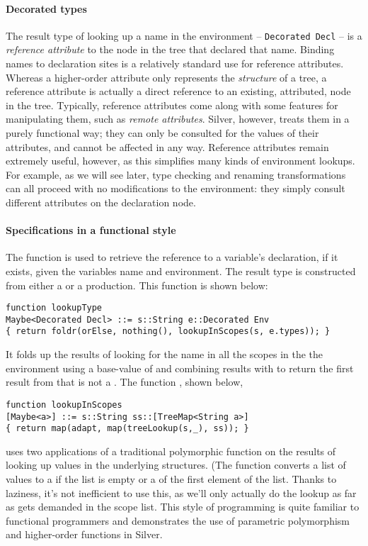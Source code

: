 \paragraph{Decorated types}
The result type of looking up a name in the environment -- \texttt{Decorated Decl} --
is a \textit{reference attribute} to the node in the tree that declared that name.
%
Binding names to declaration sites is a relatively standard use for
reference attributes.
%
%
Whereas a higher-order attribute only represents the \textit{structure} of
a tree, a reference attribute is actually a direct reference to an existing,
attributed, node in the tree.
%
Typically, reference attributes come along with some features for manipulating
them, such as \textit{remote attributes}.
%
Silver, however, treats them in a purely functional way; they can only be
consulted for the values of their attributes, and cannot be affected in
any way.
%
Reference attributes remain extremely useful, however, as this simplifies
many kinds of environment lookups.
%
For example, as we will see later, type checking and renaming transformations
can all proceed with no modifications to the environment: they simply consult
different attributes on the declaration node.

\paragraph{Specifications in a functional style}
The function  is used to retrieve the reference to a
variable's declaration, if it exists, given the variables name and
environment.  The result  type is constructed from either
a  or a  production.   This function is shown below:
\begin{verbatim}
function lookupType
Maybe<Decorated Decl> ::= s::String e::Decorated Env
{ return foldr(orElse, nothing(), lookupInScopes(s, e.types)); }
\end{verbatim}
It folds up the results of looking for the name  in all the
scopes in the the environment using a base-value of  and
combining results with  to return the first result from
 that is not a .
%
The function , shown below,
\begin{verbatim}
function lookupInScopes
[Maybe<a>] ::= s::String ss::[TreeMap<String a>]
{ return map(adapt, map(treeLookup(s,_), ss)); }
\end{verbatim}
uses two applications of a
traditional polymorphic  function on the results of looking
up values in the underlying  structures.  (The
 function converts a list of values to a 
if the list is empty or a  of the first element of the list.
Thanks to laziness, it's not inefficient to use this, as we'll only
actually do the lookup as far as gets demanded in the scope list.
This style of programming is quite familiar to functional programmers
and demonstrates the use of parametric polymorphism and higher-order
functions in Silver.


